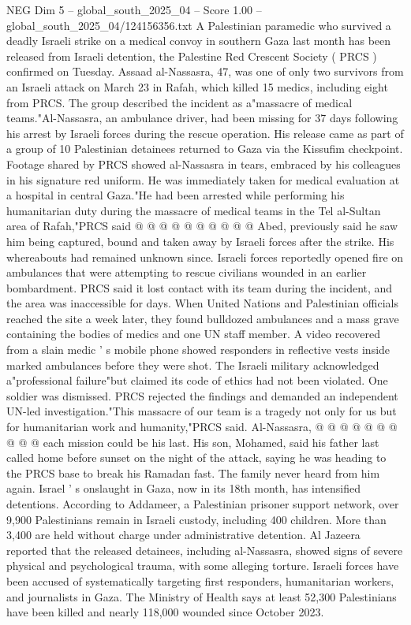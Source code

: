 \begin{textsample}{NEG Dim 5 – global\_south\_2025\_04 – Score 1.00 – global\_south\_2025\_04/124156356.txt}  \label{ex:f5_neg_396}
A Palestinian paramedic who survived a deadly Israeli strike on a medical convoy in southern Gaza last month has been released from Israeli detention, the Palestine Red Crescent Society ( PRCS ) confirmed on Tuesday.
Assaad al-Nassasra, 47, was one of only two survivors from an Israeli attack on March 23 in Rafah, which killed 15 medics, including eight from PRCS.
The group described the incident as a"massacre of medical teams."Al-Nassasra, an ambulance driver, had been missing for 37 days following his arrest by Israeli forces during the rescue operation.
His release came as part of a group of 10 Palestinian detainees returned to Gaza via the Kissufim checkpoint.
Footage shared by PRCS showed al-Nassasra in tears, embraced by his colleagues in his signature red uniform.
He was immediately taken for medical evaluation at a hospital in central Gaza."He had been arrested while performing his humanitarian duty during the massacre of medical teams in the Tel al-Sultan area of Rafah,"PRCS said @ @ @ @ @ @ @ @ @ @ Abed, previously said he saw him being captured, bound and taken away by Israeli forces after the strike.
His whereabouts had remained unknown since.
Israeli forces reportedly opened fire on ambulances that were attempting to rescue civilians wounded in an earlier bombardment.
PRCS said it lost contact with its team during the incident, and the area was inaccessible for days.
When United Nations and Palestinian officials reached the site a week later, they found bulldozed ambulances and a mass grave containing the bodies of medics and one UN staff member.
A video recovered from a slain medic ' s mobile phone showed responders in reflective vests inside marked ambulances before they were shot.
The Israeli military acknowledged a"professional failure"but claimed its code of ethics had not been violated.
One soldier was dismissed.
PRCS rejected the findings and demanded an independent UN-led investigation."This massacre of our team is a tragedy not only for us but for humanitarian work and humanity,"PRCS said.
Al-Nassasra, @ @ @ @ @ @ @ @ @ @ each mission could be his last.
His son, Mohamed, said his father last called home before sunset on the night of the attack, saying he was heading to the PRCS base to break his Ramadan fast.
The family never heard from him again.
Israel ' s onslaught in Gaza, now in its 18th month, has intensified detentions.
According to Addameer, a Palestinian prisoner support network, over 9,900 Palestinians remain in Israeli custody, including 400 children.
More than 3,400 are held without charge under administrative detention.
Al Jazeera reported that the released detainees, including al-Nassasra, showed signs of severe physical and psychological trauma, with some alleging torture.
Israeli forces have been accused of systematically targeting first responders, humanitarian workers, and journalists in Gaza.
The Ministry of Health says at least 52,300 Palestinians have been killed and nearly 118,000 wounded since October 2023.

\end{textsample}
